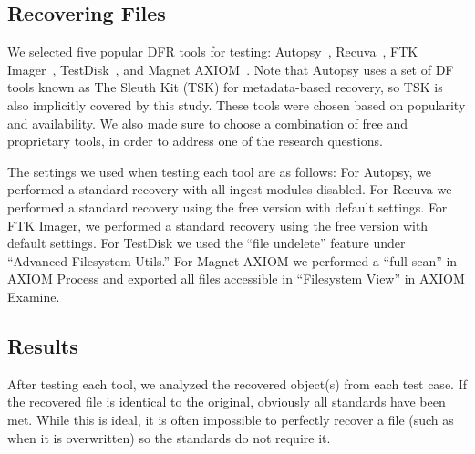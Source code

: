 
\subsection{Recovering Files}

We selected five popular DFR tools for testing: Autopsy~\cite{autopsy}, Recuva~\cite{recuva}, FTK Imager~\cite{ftk}, TestDisk~\cite{testdisk}, and Magnet AXIOM~\cite{axiom}. 
Note that Autopsy uses a set of DF tools known as The Sleuth Kit (TSK) for metadata-based recovery, so TSK is also implicitly covered by this study. 
These tools were chosen based on popularity and availability.
We also made sure to choose a combination of free and proprietary tools, in order to address one of the research questions.

The settings we used when testing each tool are as follows:
For Autopsy, we performed a standard recovery with all ingest modules disabled.
For Recuva we performed a standard recovery using the free version with default settings.
For FTK Imager, we performed a standard recovery using the free version with default settings.
For TestDisk we used the ``file undelete'' feature under ``Advanced Filesystem Utils.''
For Magnet AXIOM we performed a ``full scan'' in AXIOM Process and exported all files accessible in ``Filesystem View'' in AXIOM Examine.

\subsection{Results}

After testing each tool, we analyzed the recovered object(s) from each test case. 
If the recovered file is identical to the original, obviously all standards have been met. 
While this is ideal, it is often impossible to perfectly recover a file (such as when it is overwritten) so the standards do not require it. 

